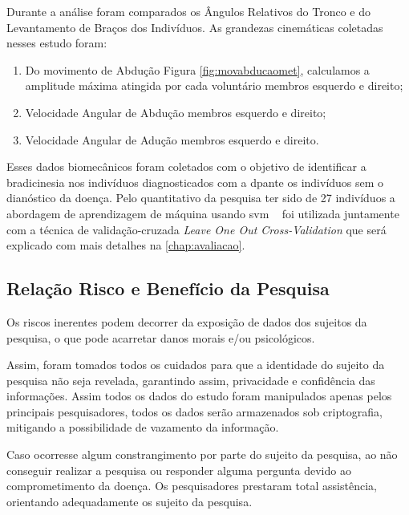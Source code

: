 Durante a análise foram comparados os Ângulos Relativos do Tronco e do Levantamento de Braços dos Indivíduos. As grandezas cinemáticas coletadas nesses estudo foram:
\begin{enumerate}
	\item Do movimento de Abdução Figura \ref{fig:movabducaomet}, calculamos a amplitude máxima atingida por cada voluntário membros esquerdo e direito;
	\item Velocidade Angular de Abdução membros esquerdo e direito;
	\item Velocidade Angular de Adução membros esquerdo e direito.
\end{enumerate}

Esses dados biomecânicos foram coletados com o objetivo de identificar a bradicinesia nos indivíduos diagnosticados com a \ac{dp}ante os indivíduos sem o dianóstico da doença.
Pelo quantitativo da pesquisa ter sido de 27 indivíduos a abordagem de aprendizagem de máquina usando \ac{svm} ~\cite{vapnik95} foi utilizada juntamente com a técnica de validação-cruzada \textit{Leave One Out Cross-Validation} que será explicado com mais detalhes na \ref{chap:avaliacao}.


\subsection{Relação Risco e Benefício da Pesquisa}
Os riscos inerentes podem decorrer da exposição de dados dos sujeitos da pesquisa, o que pode acarretar danos morais e/ou psicológicos.

Assim, foram tomados todos os cuidados para que a identidade do sujeito da pesquisa não seja revelada, garantindo assim, privacidade e confidência das informações. Assim todos os dados do estudo foram manipulados apenas pelos principais pesquisadores, todos os dados serão armazenados sob criptografia, mitigando a possibilidade de vazamento da informação.

Caso ocorresse algum constrangimento por parte do sujeito da pesquisa, ao não conseguir realizar a pesquisa ou responder alguma pergunta devido ao comprometimento da doença. Os pesquisadores prestaram total assistência, orientando adequadamente os sujeito da pesquisa.




